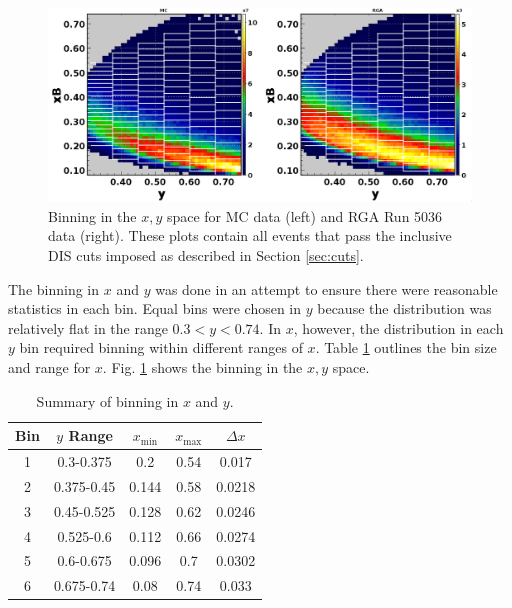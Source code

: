 \begin{figure}[h!]
	\centering
	\includegraphics[width=0.9\linewidth]{figures/rga/xB_vs_y_bins.png}
	\caption{Binning in the $x,y$ space for MC data (left) and RGA Run 5036 data (right). These plots contain all events that pass the inclusive DIS cuts imposed as described in Section \ref{sec:cuts}.}
	\label{fig:xb_vs_y_bins}
\end{figure}

The binning in $x$ and $y$ was done in an attempt to ensure there were reasonable statistics in each bin. Equal bins were chosen in $y$ because the distribution was relatively flat in the range $0.3 < y < 0.74$. In $x$, however, the distribution in each $y$ bin required binning within different ranges of $x$. Table \ref{table:xB_bins} outlines the bin size and range for $x$. Fig. \ref{fig:xb_vs_y_bins} shows the binning in the $x,y$ space. 

\begin{table}[h!]
	\centering
	\begin{tabular}{ |c|c|c|c|c| } 
		\hline
		Bin & $y$ Range & $x_{\mathrm{min}}$ & $x_{\mathrm{max}}$ & $\Delta x$ \\
		\hline
		1 & 0.3-0.375 & 0.2 & 0.54 & 0.017 \\
		2 & 0.375-0.45 & 0.144 & 0.58 & 0.0218 \\
		3 & 0.45-0.525 & 0.128 & 0.62 & 0.0246 \\
		4 & 0.525-0.6 & 0.112 & 0.66 & 0.0274 \\
		5 & 0.6-0.675 & 0.096 & 0.7 & 0.0302 \\
		6 & 0.675-0.74 & 0.08 & 0.74 & 0.033 \\
		\hline
	\end{tabular}
	\caption{Summary of binning in $x$ and $y$.}
	\label{table:xB_bins}
\end{table}

